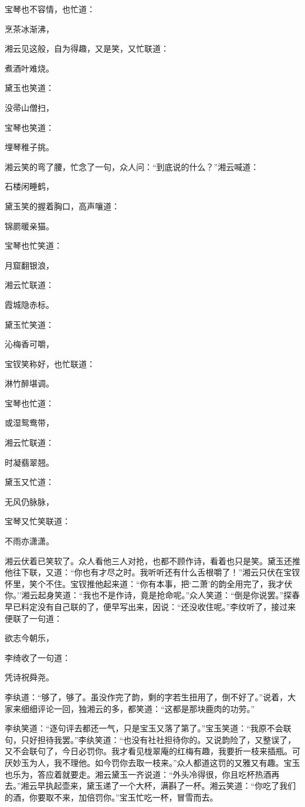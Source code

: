 宝琴也不容情，也忙道：

烹茶冰渐沸，

湘云见这般，自为得趣，又是笑，又忙联道：

煮酒叶难烧。

黛玉也笑道：

没帚山僧扫，

宝琴也笑道：

埋琴稚子挑。

湘云笑的弯了腰，忙念了一句，众人问：``到底说的什么？''湘云喊道：

石楼闲睡鹤，

黛玉笑的握着胸口，高声嚷道：

锦罽暖亲猫。

宝琴也忙笑道：

月窟翻银浪，

湘云忙联道：

霞城隐赤标。

黛玉忙笑道：

沁梅香可嚼，

宝钗笑称好，也忙联道：

淋竹醉堪调。

宝琴也忙道：

或湿鸳鸯带，

湘云忙联道：

时凝翡翠翘。

黛玉又忙道：

无风仍脉脉，

宝琴又忙笑联道：

不雨亦潇潇。

湘云伏着已笑软了。众人看他三人对抢，也都不顾作诗，看着也只是笑。黛玉还推他往下联，又道：``你也有才尽之时。我听听还有什么舌根嚼了！''湘云只伏在宝钗怀里，笑个不住。宝钗推他起来道：``你有本事，把`二萧'的韵全用完了，我才伏你。''湘云起身笑道：``我也不是作诗，竟是抢命呢。''众人笑道：``倒是你说罢。''探春早已料定没有自己联的了，便早写出来，因说：``还没收住呢。''李纹听了，接过来便联了一句道：

欲志今朝乐，

李绮收了一句道：

凭诗祝舜尧。

李纨道：``够了，够了。虽没作完了韵，剩的字若生扭用了，倒不好了。''说着，大家来细细评论一回，独湘云的多，都笑道：``这都是那块鹿肉的功劳。''

李纨笑道：``逐句评去都还一气，只是宝玉又落了第了。''宝玉笑道：``我原不会联句，只好担待我罢。''李纨笑道：``也没有社社担待你的。又说韵险了，又整误了，又不会联句了，今日必罚你。我才看见栊翠庵的红梅有趣，我要折一枝来插瓶。可厌妙玉为人，我不理他。如今罚你去取一枝来。''众人都道这罚的又雅又有趣。宝玉也乐为，答应着就要走。湘云黛玉一齐说道：``外头冷得很，你且吃杯热酒再去。''湘云早执起壶来，黛玉递了一个大杯，满斟了一杯。湘云笑道：``你吃了我们的酒，你要取不来，加倍罚你。''宝玉忙吃一杯，冒雪而去。

